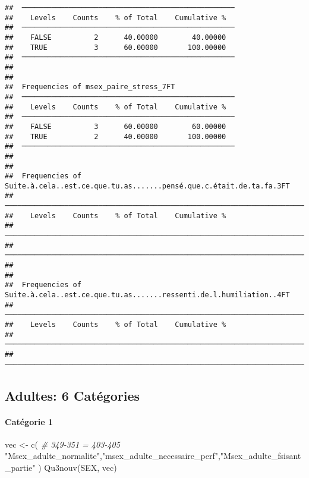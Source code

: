 \documentclass[
]{article}
\newenvironment{Shaded}{\begin{snugshade}}{\end{snugshade}}
\newcommand{\CommentTok}[1]{\textcolor[rgb]{0.56,0.35,0.01}{\textit{#1}}}
\newcommand{\FunctionTok}[1]{\textcolor[rgb]{0.00,0.00,0.00}{#1}}
\newcommand{\NormalTok}[1]{#1}
\newcommand{\OtherTok}[1]{\textcolor[rgb]{0.56,0.35,0.01}{#1}}
\newcommand{\StringTok}[1]{\textcolor[rgb]{0.31,0.60,0.02}{#1}}
\begin{document}
\begin{verbatim}
##  ────────────────────────────────────────────────── 
##    Levels    Counts    % of Total    Cumulative %   
##  ────────────────────────────────────────────────── 
##    FALSE          2      40.00000        40.00000   
##    TRUE           3      60.00000       100.00000   
##  ────────────────────────────────────────────────── 
## 
## 
##  Frequencies of msex_paire_stress_7FT               
##  ────────────────────────────────────────────────── 
##    Levels    Counts    % of Total    Cumulative %   
##  ────────────────────────────────────────────────── 
##    FALSE          3      60.00000        60.00000   
##    TRUE           2      40.00000       100.00000   
##  ────────────────────────────────────────────────── 
## 
## 
##  Frequencies of Suite.à.cela..est.ce.que.tu.as.......pensé.que.c.était.de.ta.fa.3FT 
##  ────────────────────────────────────────────────────────────────────────────────── 
##    Levels    Counts    % of Total    Cumulative %   
##  ────────────────────────────────────────────────────────────────────────────────── 
##  ────────────────────────────────────────────────────────────────────────────────── 
## 
## 
##  Frequencies of Suite.à.cela..est.ce.que.tu.as.......ressenti.de.l.humiliation..4FT 
##  ────────────────────────────────────────────────────────────────────────────────── 
##    Levels    Counts    % of Total    Cumulative %   
##  ────────────────────────────────────────────────────────────────────────────────── 
##  ──────────────────────────────────────────────────────────────────────────────────
\end{verbatim}

\hypertarget{adultes-6-catuxe9gories}{%
\subsection{Adultes: 6 Catégories}\label{adultes-6-catuxe9gories}}

\hypertarget{catuxe9gorie-1-4}{%
\paragraph{Catégorie 1}\label{catuxe9gorie-1-4}}

\begin{Shaded}
\begin{Highlighting}[]
\NormalTok{vec }\OtherTok{\textless{}{-}} \FunctionTok{c}\NormalTok{(  }\CommentTok{\# 349{-}351 = 403{-}405}
  \StringTok{"Msex\_adulte\_normalite"}\NormalTok{,}\StringTok{"msex\_adulte\_necessaire\_perf"}\NormalTok{,}\StringTok{"Msex\_adulte\_fsisant\_partie"}
\NormalTok{)}
\FunctionTok{Qu3nouv}\NormalTok{(SEX, vec)}
\end{Highlighting}
\end{Shaded}
\end{document}
